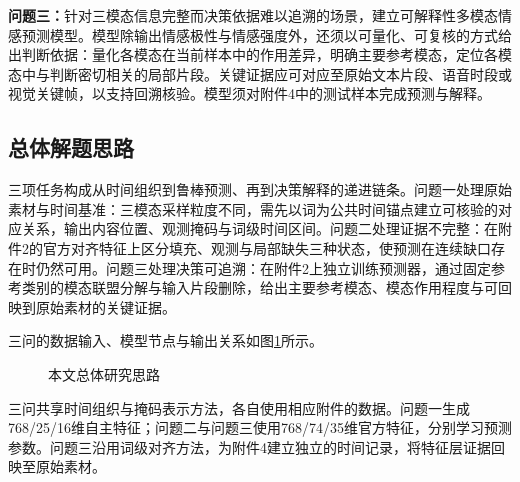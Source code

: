 \textbf{问题三：}针对三模态信息完整而决策依据难以追溯的场景，建立可解释性多模态情感预测模型。模型除输出情感极性与情感强度外，还须以可量化、可复核的方式给出判断依据：量化各模态在当前样本中的作用差异，明确主要参考模态，定位各模态中与判断密切相关的局部片段。关键证据应可对应至原始文本片段、语音时段或视觉关键帧，以支持回溯核验。模型须对附件4中的测试样本完成预测与解释。

\subsection{总体解题思路}
三项任务构成从时间组织到鲁棒预测、再到决策解释的递进链条。问题一处理原始素材与时间基准：三模态采样粒度不同，需先以词为公共时间锚点建立可核验的对应关系，输出内容位置、观测掩码与词级时间区间。问题二处理证据不完整：在附件2的官方对齐特征上区分填充、观测与局部缺失三种状态，使预测在连续缺口存在时仍然可用。问题三处理决策可追溯：在附件2上独立训练预测器，通过固定参考类别的模态联盟分解与输入片段删除，给出主要参考模态、模态作用程度与可回映到原始素材的关键证据。

三问的数据输入、模型节点与输出关系如图\ref{prob:fig:framework}所示。

\begin{figure}[htbp]
\centering
\resizebox{\linewidth}{!}{%
}
\caption{本文总体研究思路}
\label{prob:fig:framework}
\end{figure}

三问共享时间组织与掩码表示方法，各自使用相应附件的数据。问题一生成768/25/16维自主特征；问题二与问题三使用768/74/35维官方特征，分别学习预测参数。问题三沿用词级对齐方法，为附件4建立独立的时间记录，将特征层证据回映至原始素材。
